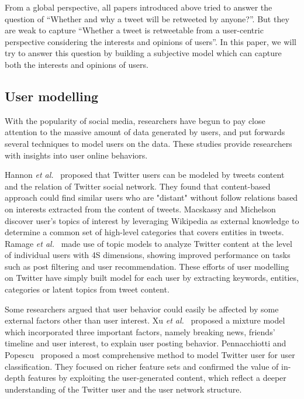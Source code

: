 \documentclass{acm_proc_article-sp}
\begin{document}
From a global perspective, all papers introduced above tried to answer the question of ``Whether and why a tweet will be retweeted by anyone?''. 
But they are weak to capture ``Whether a tweet is retweetable from a user-centric perspective considering the interests and opinions of users''. 
In this paper, we will try to answer this question by building a subjective model which can capture both the interests and opinions of users.

\subsection{User modelling}
With the popularity of social media, researchers have begun to pay close attention to the massive amount of data generated by users, and put forwards several techniques to model users on the data. These studies provide researchers with insights into user online behaviors. 

Hannon \emph{et al.}~\cite{Hannon:2010} proposed that Twitter users can be modeled by tweets content and the relation of Twitter social network.
They found that content-based approach could find similar users who are "distant" without follow relations based on interests extracted from the content of tweets. 
Macskassy and Michelson~\cite{conf/icwsm/MacskassyM11} discover user's topics of interest by leveraging Wikipedia as external knowledge to determine a common set of high-level categories that covers entities in tweets. 
Ramage \emph{et al.}~\cite{RamageEtAl:10} made use of topic models to analyze Twitter content at the level of individual users with 4S dimensions, showing improved performance on tasks such as post filtering and user recommendation. 
These efforts of user modelling on Twitter have simply built model for each user by extracting keywords, entities, categories or latent topics from tweet content. 

Some researchers argued that user behavior could easily be affected by some external factors other than user interest.
Xu \emph{et al.}~\cite{Xu:2012MUP} proposed a mixture model which incorporated three important factors, namely breaking news, friends' timeline and user interest, to explain user posting behavior.
Pennacchiotti and Popescu~\cite{Pennacchiotti:icwsm11} proposed a most comprehensive method to model Twitter user for user classification. They focused on richer feature sets and confirmed the value of in-depth features by exploiting the user-generated content, which reflect a deeper understanding of the Twitter user and the user network structure.
\end{document}
